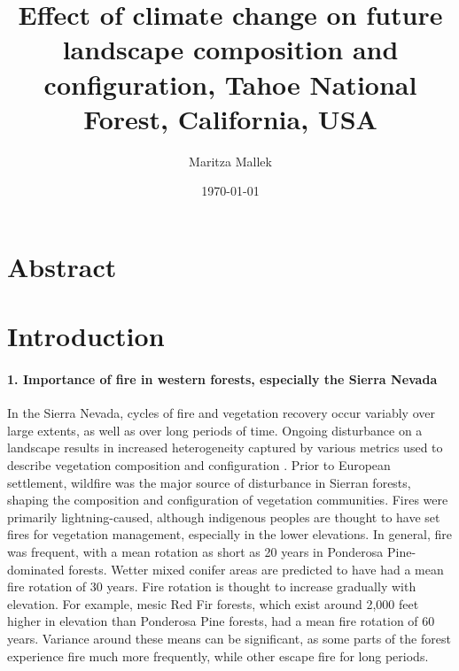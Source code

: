 \documentclass[12pt]{article}
\title{Effect of climate change on future landscape composition and configuration, Tahoe National Forest, California, USA}
\author{ Maritza Mallek }
\date{\today}
\begin{document}
\maketitle
\begin{spacing}{1}


\section*{Abstract}

\section*{Introduction}

\paragraph{1. Importance of fire in western forests, especially the Sierra Nevada}
In the Sierra Nevada, cycles of fire and vegetation recovery occur variably over large extents, as well as over long periods of time. Ongoing disturbance on a landscape results in increased heterogeneity captured by various metrics used to describe vegetation composition and configuration \citep{Monica2008}. Prior to European settlement, wildfire was the major source of disturbance in Sierran forests, shaping the composition and configuration of vegetation communities. Fires were primarily lightning-caused, although indigenous peoples are thought to have set fires for vegetation management, especially in the lower elevations. In general, fire was frequent, with a mean rotation as short as 20 years in Ponderosa Pine-dominated forests. Wetter mixed conifer areas are predicted to have had a mean fire rotation of 30 years. Fire rotation is thought to increase gradually with elevation. For example, mesic Red Fir forests, which exist around 2,000 feet higher in elevation than Ponderosa Pine forests, had a mean fire rotation of 60 years. Variance around these means can be significant, as some parts of the forest experience fire much more frequently, while other escape fire for long periods. 


\end{spacing}
\end{document}
